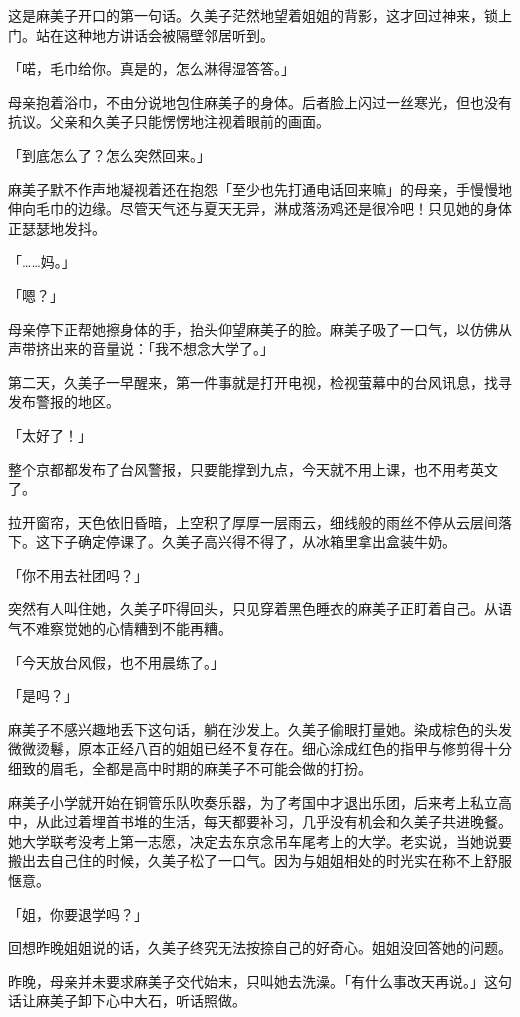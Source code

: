 \documentclass[UTF8]{ctexart}
\begin{document}
    这是麻美子开口的第一句话。久美子茫然地望着姐姐的背影，这才回过神来，锁上门。站在这种地方讲话会被隔壁邻居听到。 

    「喏，毛巾给你。真是的，怎么淋得湿答答。」 

    母亲抱着浴巾，不由分说地包住麻美子的身体。后者脸上闪过一丝寒光，但也没有抗议。父亲和久美子只能愣愣地注视着眼前的画面。 

    「到底怎么了？怎么突然回来。」 

    麻美子默不作声地凝视着还在抱怨「至少也先打通电话回来嘛」的母亲，手慢慢地伸向毛巾的边缘。尽管天气还与夏天无异，淋成落汤鸡还是很冷吧！只见她的身体正瑟瑟地发抖。 

    「……妈。」 

    「嗯？」 

    母亲停下正帮她擦身体的手，抬头仰望麻美子的脸。麻美子吸了一口气，以仿佛从声带挤出来的音量说：「我不想念大学了。」 

    第二天，久美子一早醒来，第一件事就是打开电视，检视萤幕中的台风讯息，找寻发布警报的地区。 

    「太好了！」 

    整个京都都发布了台风警报，只要能撑到九点，今天就不用上课，也不用考英文了。 

    拉开窗帘，天色依旧昏暗，上空积了厚厚一层雨云，细线般的雨丝不停从云层间落下。这下子确定停课了。久美子高兴得不得了，从冰箱里拿出盒装牛奶。 

    「你不用去社团吗？」 

    突然有人叫住她，久美子吓得回头，只见穿着黑色睡衣的麻美子正盯着自己。从语气不难察觉她的心情糟到不能再糟。 

    「今天放台风假，也不用晨练了。」 

    「是吗？」 

    麻美子不感兴趣地丢下这句话，躺在沙发上。久美子偷眼打量她。染成棕色的头发微微烫鬈，原本正经八百的姐姐已经不复存在。细心涂成红色的指甲与修剪得十分细致的眉毛，全都是高中时期的麻美子不可能会做的打扮。 

    麻美子小学就开始在铜管乐队吹奏乐器，为了考国中才退出乐团，后来考上私立高中，从此过着埋首书堆的生活，每天都要补习，几乎没有机会和久美子共进晚餐。她大学联考没考上第一志愿，决定去东京念吊车尾考上的大学。老实说，当她说要搬出去自己住的时候，久美子松了一口气。因为与姐姐相处的时光实在称不上舒服惬意。 

    「姐，你要退学吗？」 

    回想昨晚姐姐说的话，久美子终究无法按捺自己的好奇心。姐姐没回答她的问题。 

    昨晚，母亲并未要求麻美子交代始末，只叫她去洗澡。「有什么事改天再说。」这句话让麻美子卸下心中大石，听话照做。 
\end{document}
